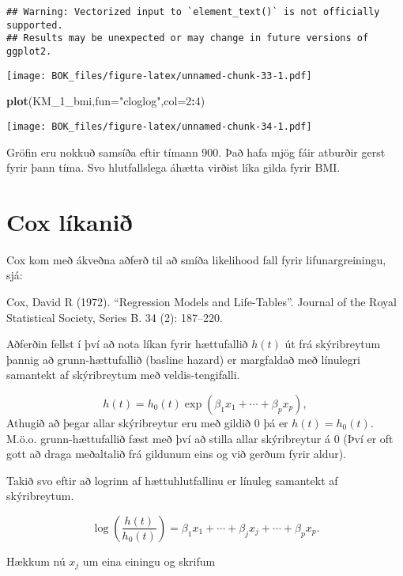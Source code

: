 \documentclass[
]{book}
\newenvironment{Shaded}{\begin{snugshade}}{\end{snugshade}}
\newcommand{\DataTypeTok}[1]{\textcolor[rgb]{0.13,0.29,0.53}{#1}}
\newcommand{\DecValTok}[1]{\textcolor[rgb]{0.00,0.00,0.81}{#1}}
\newcommand{\KeywordTok}[1]{\textcolor[rgb]{0.13,0.29,0.53}{\textbf{#1}}}
\newcommand{\NormalTok}[1]{#1}
\newcommand{\OperatorTok}[1]{\textcolor[rgb]{0.81,0.36,0.00}{\textbf{#1}}}
\newcommand{\StringTok}[1]{\textcolor[rgb]{0.31,0.60,0.02}{#1}}
\begin{document}
\begin{verbatim}
## Warning: Vectorized input to `element_text()` is not officially supported.
## Results may be unexpected or may change in future versions of ggplot2.
\end{verbatim}

\texttt{[image: BOK\_files/figure-latex/unnamed-chunk-33-1.pdf]}

\begin{Shaded}
\begin{Highlighting}[]
\KeywordTok{plot}\NormalTok{(KM\_}\DecValTok{1}\NormalTok{\_bmi,}\DataTypeTok{fun=}\StringTok{"cloglog"}\NormalTok{,}\DataTypeTok{col=}\DecValTok{2}\OperatorTok{:}\DecValTok{4}\NormalTok{)}
\end{Highlighting}
\end{Shaded}

\texttt{[image: BOK\_files/figure-latex/unnamed-chunk-34-1.pdf]}

Gröfin eru nokkuð samsíða eftir tímann 900. Það hafa mjög fáir atburðir gerst fyrir þann tíma. Svo hlutfallslega áhætta virðist líka gilda fyrir BMI.

\hypertarget{cox}{%
\section{Cox líkanið}\label{cox}}

Cox kom með ákveðna aðferð til að smíða likelihood fall fyrir lifunargreiningu, sjá:

Cox, David R (1972). ``Regression Models and Life-Tables''. Journal of the Royal Statistical Society, Series B. 34 (2): 187--220.

Aðferðin fellst í því að nota líkan fyrir hættufallið \(h(t)\) út frá skýribreytum þannig að grunn-hættufallið (basline hazard) er margfaldað með línulegri samantekt af skýribreytum með veldis-tengifalli.

\[
h(t) = h_0(t) \exp(\beta_1 x_1 + \cdots + \beta_p x_p),
\]
Athugið að þegar allar skýribreytur eru með gildið 0 þá er \(h(t) = h_0(t)\). M.ö.o. grunn-hættufallið fæst með því að stilla allar skýribreytur á 0 (Því er oft gott að draga meðaltalið frá gildunum eins og við gerðum fyrir aldur).

Takið svo eftir að logrinn af hættuhlutfallinu er línuleg samantekt af skýribreytum.

\[
\log \left( \frac{h(t)}{h_0(t)} \right) = \beta_1 x_1 + \cdots + \beta_j x_j + \cdots + \beta_p x_p.
\]

Hækkum nú \(x_j\) um eina einingu og skrifum
\end{document}
